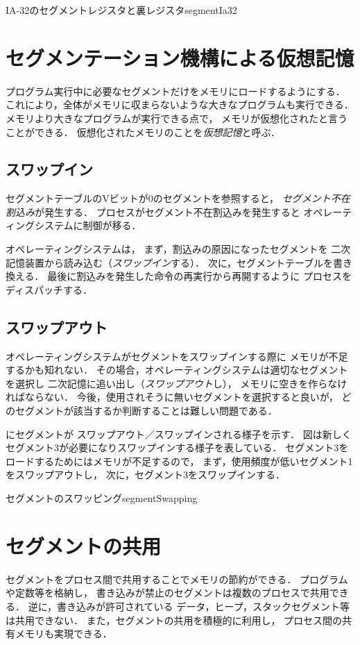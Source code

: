 {IA-32のセグメントレジスタと裏レジスタ}{segmentIa32}

\section{セグメンテーション機構による仮想記憶}
プログラム実行中に必要なセグメントだけをメモリにロードするようにする．
これにより，全体がメモリに収まらないような大きなプログラムも実行できる．
メモリより大きなプログラムが実行できる点で，
メモリが仮想化されたと言うことができる．
仮想化されたメモリのことを\emph{仮想記憶}と呼ぶ．

\subsection{スワップイン}
セグメントテーブルのVビットが0のセグメントを参照すると，
\emph{セグメント不在割込み}が発生する．
プロセスがセグメント不在割込みを発生すると
オペレーティングシステムに制御が移る．

オペレーティングシステムは，
まず，割込みの原因になったセグメントを
二次記憶装置から読み込む（\emph{スワップイン}する）．
次に，セグメントテーブルを書き換える．
最後に割込みを発生した命令の再実行から再開するように
プロセスをディスパッチする．

\subsection{スワップアウト}
オペレーティングシステムがセグメントをスワップインする際に
メモリが不足するかも知れない．
その場合，オペレーティングシステムは適切なセグメントを選択し
二次記憶に追い出し（\emph{スワップアウト}し），
メモリに空きを作らなければならない．
今後，使用されそうに無いセグメントを選択すると良いが，
どのセグメントが該当するか判断することは難しい問題である．

にセグメントが
スワップアウト／スワップインされる様子を示す．
図は新しくセグメント3が必要になりスワップインする様子を表している．
セグメント3をロードするためにはメモリが不足するので，
まず，使用頻度が低いセグメント1をスワップアウトし，
次に，セグメント3をスワップインする．

{セグメントのスワッピング}{segmentSwapping}

\section{セグメントの共用}
セグメントをプロセス間で共用することでメモリの節約ができる．
プログラムや定数等を格納し，
書き込みが禁止のセグメントは複数のプロセスで共用できる．
逆に，書き込みが許可されている
データ，ヒープ，スタックセグメント等は共用できない．
また，セグメントの共用を積極的に利用し，
プロセス間の共有メモリも実現できる．

